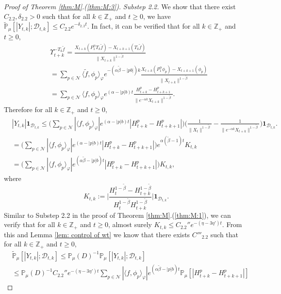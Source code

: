 \documentclass[12pt,a4paper]{amsart}
\theoremstyle{plain}
\theoremstyle{definition}
\numberwithin{equation}{section}
\begin{document}
\begin{proof}[Proof of Theorem \ref{thm:M}.(\ref{thm:M:3})]
  \emph{Substep 2.2.} We show that there exist $C_{2.2}, \delta_{2.2}>0$ such that for all $k \in \mathbb Z_+$ and $t\geq 0$, we have $\widetilde {\mathbb {P}}_\mu[|Y_{t,k}|; \mathcal D_{t,k}]\leq C_{2.2}e^{- \delta_{2,2} t}$.
  In fact, it can be verified that for all $k \in \mathbb Z_+$ and $t\geq 0$,
  \begin{align}
    & \Upsilon_{t+k}^{-T_k\tilde f}
      = \frac{X_{t+k}(P^\alpha_1T_k\tilde f) - X_{t+k+1}(T_k \tilde f)}{\|X_{t+k}\|^{1 - \tilde \beta}}
    \\& = \sum_{p\in \mathcal N}
    \langle\tilde f,\phi_p\rangle_\varphi e^{-(\alpha \tilde \beta - |pb|)k}\frac{ X_{t+k}(P_1^\alpha \phi_p) - X_{t+k+1}(\phi_p)}{\|X_{t+k}\|^{1 - \tilde \beta}}
    \\& = \sum_{p\in \mathcal N}
    \langle f,\phi_p\rangle_\varphi  e^{(\alpha  -|p|b)t}\frac{H_{t+k}^p-H_{t+k+1}^p }{\|e^{-\alpha k}X_{t+k}\|^{1 - \tilde \beta}}.
  \end{align}
  Therefore for all $k\in \mathbb Z_+$ and $t\geq 0$,
  \begin{align}
    &|Y_{t,k}| \mathbf 1_{\mathcal D_{t,k}}
      \leq \Big( \sum_{p\in \mathcal N}|\langle f,\phi_p\rangle_\varphi|  e^{(\alpha  -|p|b)t} | H_{t+k}^p-H_{t+k+1}^p |\Big) \Big( \frac{1}{\|X_t\|^{1 - \tilde \beta}} - \frac{1}{\|e^{-\alpha k}X_{t+k}\|^{1 - \tilde \beta}} \Big)\mathbf 1_{\mathcal D_{t,k}}.
    \\ &= \Big( \sum_{p\in \mathcal N}|\langle f,\phi_p\rangle_\varphi|  e^{(\alpha  -|p|b)t} | H_{t+k}^p-H_{t+k+1}^p |\Big)e^{\alpha (\tilde \beta - 1)t} K_{t,k}
    \\ &= \Big( \sum_{p\in \mathcal N}|\langle f,\phi_p\rangle_\varphi|  e^{(\alpha \tilde \beta  -|p|b)t} | H_{t+k}^p-H_{t+k+1}^p |\Big) K_{t,k},
  \end{align}
  where
  \[
    K_{t,k}
    := \Big| \frac {H_t^{1- \tilde \beta} - H_{t+k}^{1 - \tilde \beta}} {H_t^{1 - \tilde \beta} H_{t+k}^{ 1- \tilde \beta }} \Big| \mathbf{1}_{\mathcal{D}_{t,k}}.
  \]
  Similar to Substep 2.2 in the proof of Theorem \ref{thm:M}.(\ref{thm:M:1}), we can verify that for all $k\in \mathbb Z_+$ and $t\geq 0$, almost surely $K_{t,k} \leq C_{2.2}'' e^{- (\eta - 3\eta')t}$.
  From this and Lemma \ref{lem: control of wt} we know that there exists $C'''_{2.2}$ such that for all $k\in \mathbb Z_+$ and $t\geq 0$,
  \begin{align}
    & \widetilde{\mathbb P}_\mu[|Y_{t,k}|; \mathcal D_{t,k}]
      \leq \mathbb P_\mu(D)^{-1}\mathbb P_\mu[ |Y_{t,k}| ;\mathcal D_{t,k} ]
    \\ & \leq \mathbb P_{\mu}(D)^{-1} C_{2.2}'' e^{- (\eta - 3\eta') t}\sum_{p\in \mathcal {N}} |\langle f,\phi_p\rangle_\varphi|  e^{(\alpha \tilde \beta  -|p|b)t} \mathbb P_\mu[| H_{t+k}^p-H_{t+k+1}^p |]

\end{align}
\end{proof}
\end{document}
